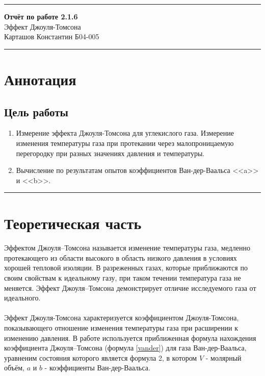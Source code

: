 \documentclass[a4paper,12pt]{article} %
\begin{document}
\hrule 	
\medskip
\begin{raggedright}
{\large \textbf{Отчёт по работе 2.1.6}}
\\
\medskip
{\Large Эффект Джоуля-Томсона} 
\\
\medskip
{\large Карташов Константин Б04-005}
\medskip
\hrule
\medskip
\end{raggedright}


\section{Аннотация}

\subsection{Цель работы}

\begin{enumerate}
\item Измерение эффекта Джоуля-Томсона для углекислого газа. Измерение изменения температуры газа при протекании через малопроницаемую перегородку при разных значениях давления и температуры.
\item Вычисление по результатам опытов коэффициентов Ван-дер-Ваальса <<a>> и <<b>>.
\end{enumerate}


\medskip\hrule\medskip

\section{Теоретическая часть}

\paragraph{}
Эффектом Джоуля–Томсона называется изменение температуры газа, медленно протекающего  из области высокого в область низкого давления в условиях хорошей тепловой изоляции. В разреженных газах, которые приближаются по своим свойствам к идеальному  газу, при таком течении температура газа не меняется. Эффект Джоуля–Томсона демонстрирует отличие исследуемого газа от идеального.

\paragraph{}
Эффект Джоуля-Томсона характеризуется коэффициентом Джоуля-Томсона, показывающего отношение изменения температуры газа при расширении к изменению давления. В работе используется приближенная формула нахождения коэффициента Джоуля–Томсона (формула \ref{vander}) для газа Ван-дер-Ваальса, уравненим состояния которого является формула 2, в котором $V$ - молярный объём, $a$ и $b$ - коэффициенты Ван-дер-Ваальса. 
\end{document}
